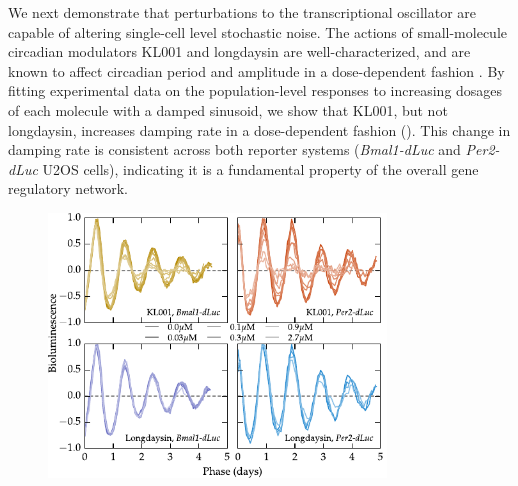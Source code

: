 We next demonstrate that perturbations to the transcriptional oscillator are capable of altering single-cell level stochastic noise.
The actions of small-molecule circadian modulators KL001 and longdaysin are well-characterized, and are known to affect circadian period and amplitude in a dose-dependent fashion \cite{St.John2014}.
By fitting experimental data on the population-level responses to increasing dosages of each molecule with a damped sinusoid, we show that KL001, but not longdaysin, increases damping rate in a dose-dependent fashion ().
This change in damping rate is consistent across both reporter systems ({\itshape Bmal1-dLuc} and {\itshape Per2-dLuc} U2OS cells), indicating it is a fundamental property of the overall gene regulatory network.

\begin{figure}[tbp]
  \begin{center}
    \includegraphics[width=0.8\textwidth]{chap6/figures/mainfig_dose_a.pdf}
  \end{center}
\label{fig:dose_dependence_a}
\end{figure}


